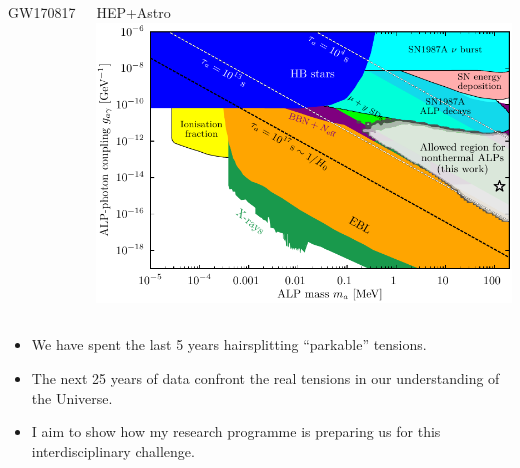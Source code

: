 \documentclass[aspectratio=169, handout]{beamer}
\begin{document}
\begin{frame}
\begin{columns}
\begin{block}{GW170817}
        \end{block}
        \begin{block}{HEP+Astro}
            \includegraphics[width=\textwidth]{figures/cosmoalp.pdf}

            \hfill{}
        \end{block}
    \end{columns}

    \begin{itemize}
        \item We have spent the last 5 years hairsplitting ``parkable'' tensions.
        \item The next 25 years of data confront the real tensions in our understanding of the Universe.
        \item I aim to show how my research programme is preparing us for this interdisciplinary challenge.
    \end{itemize}

\end{frame}
\end{document}
